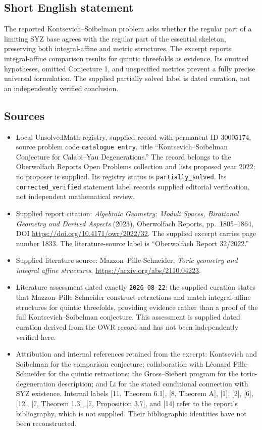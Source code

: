 \documentclass[11pt]{article}
\begin{document}
\subsection{Short English statement}
The reported Kontsevich--Soibelman problem asks whether the regular part of a limiting SYZ base agrees with the regular part of the essential skeleton, preserving both integral-affine and metric structures. The excerpt reports integral-affine comparison results for quintic threefolds as evidence. Its omitted hypotheses, omitted Conjecture 1, and unspecified metrics prevent a fully precise universal formulation. The supplied partially solved label is dated curation, not an independently verified conclusion.
\subsection{Sources}
\begin{itemize}
\item Local UnsolvedMath registry, supplied record with permanent ID \(30005174\), source problem code \texttt{catalogue entry}, title ``Kontsevich--Soibelman Conjecture for Calabi--Yau Degenerations.'' The record belongs to the Oberwolfach Reports Open Problems collection and lists proposed year \(2022\); no proposer is supplied. Its registry status is \texttt{partially\_solved}. Its \texttt{corrected\_verified} statement label records supplied editorial verification, not independent mathematical review.
\item Supplied report citation: \emph{Algebraic Geometry: Moduli Spaces, Birational Geometry and Derived Aspects} (2023), Oberwolfach Reports, pp.~1805--1864, DOI \url{https://doi.org/10.4171/owr/2022/32}. The supplied excerpt carries page number 1833. The literature-source label is ``Oberwolfach Report 32/2022.''
\item Supplied literature source: Mazzon--Pille-Schneider, \emph{Toric geometry and integral affine structures}, \url{https://arxiv.org/abs/2110.04223}.
\item Literature assessment dated exactly \texttt{2026-08-22}: the supplied curation states that Mazzon--Pille-Schneider construct retractions and match integral-affine structures for quintic threefolds, providing evidence rather than a proof of the full Kontsevich--Soibelman conjecture. This assessment is supplied dated curation derived from the OWR record and has not been independently verified here.
\item Attribution and internal references retained from the excerpt: Kontsevich and Soibelman for the comparison conjecture; collaboration with L\'eonard Pille-Schneider for the quintic retractions; the Gross--Siebert program for the toric-degeneration description; and Li for the stated conditional connection with SYZ existence. Internal labels [11, Theorem 6.1], [8, Theorem A], [1], [2], [6], [12], [7, Theorem 1.3], [7, Proposition 3.7], and [14] refer to the report's bibliography, which is not supplied. Their bibliographic identities have not been reconstructed.
\end{itemize}
\end{document}

